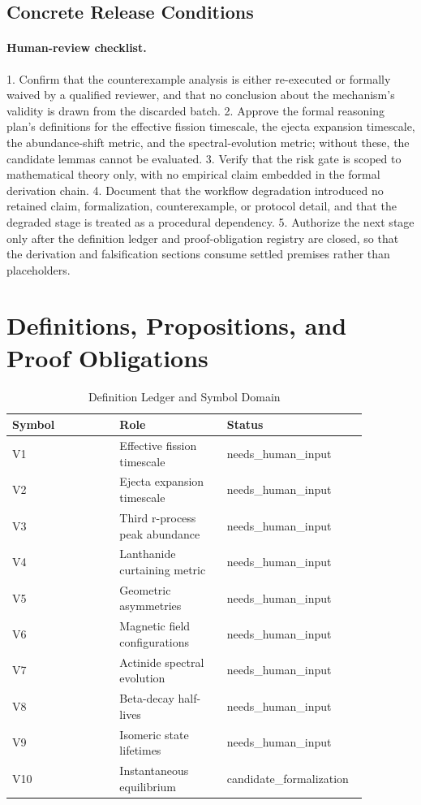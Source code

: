 \documentclass[conference]{IEEEtran}
\begin{document}
\subsection{Concrete Release Conditions}
\paragraph{Human-review checklist.} 1. Confirm that the counterexample analysis is either re-executed or formally waived by a qualified reviewer, and that no conclusion about the mechanism's validity is drawn from the discarded batch. 2. Approve the formal reasoning plan's definitions for the effective fission timescale, the ejecta expansion timescale, the abundance-shift metric, and the spectral-evolution metric; without these, the candidate lemmas cannot be evaluated. 3. Verify that the risk gate is scoped to mathematical theory only, with no empirical claim embedded in the formal derivation chain. 4. Document that the workflow degradation introduced no retained claim, formalization, counterexample, or protocol detail, and that the degraded stage is treated as a procedural dependency. 5. Authorize the next stage only after the definition ledger and proof-obligation registry are closed, so that the derivation and falsification sections consume settled premises rather than placeholders.

\section{Definitions, Propositions, and Proof Obligations}
\begin{table}[htbp]
\centering
\small


\caption{Definition Ledger and Symbol Domain}
\label{tab:definitions-and-propositions-def-ledger}
\begin{tabular}{|p{0.29\linewidth}|p{0.29\linewidth}|p{0.29\linewidth}|}
\hline
Symbol & Role & Status \\\hline
V1 & Effective fission timescale & needs\_human\_input \\\hline
V2 & Ejecta expansion timescale & needs\_human\_input \\\hline
V3 & Third r-process peak abundance & needs\_human\_input \\\hline
V4 & Lanthanide curtaining metric & needs\_human\_input \\\hline
V5 & Geometric asymmetries & needs\_human\_input \\\hline
V6 & Magnetic field configurations & needs\_human\_input \\\hline
V7 & Actinide spectral evolution & needs\_human\_input \\\hline
V8 & Beta-decay half-lives & needs\_human\_input \\\hline
V9 & Isomeric state lifetimes & needs\_human\_input \\\hline
V10 & Instantaneous equilibrium & candidate\_formalization \\\hline
\end{tabular}
\end{table}
\end{document}
